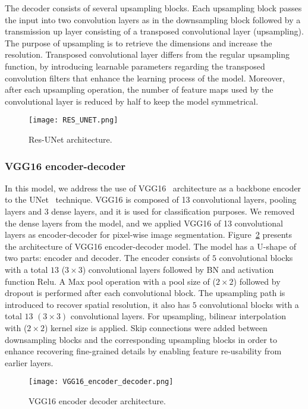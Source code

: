 The decoder consists of several upsampling blocks. 
Each upsampling block passes the input into two convolution layers as in the downsampling block followed by a transmission up layer consisting of a transposed convolutional layer (upsampling). 
The purpose of upsampling is to retrieve the dimensions and increase the resolution.
Transposed convolutional layer differs from the regular upsampling function, by introducing learnable parameters regarding the transposed convolution filters that enhance the learning process of the model. 
Moreover, after each upsampling operation, the number of feature maps used by the convolutional layer is reduced by half to keep the model symmetrical. 
\begin{figure} [h!]
	\begin{center}
		\texttt{[image: RES\_UNET.png]}
	\end{center}
	\caption{Res-UNet architecture.} 
	\label{fig:Unet}
\end{figure}
\subsubsection{VGG16 encoder-decoder}
In this model, we address the use of VGG16~\cite{Simonyan2015} architecture as a backbone encoder to the UNet~\cite{Ronneberger2015} technique.
VGG16 is composed of 13 convolutional layers, pooling layers and \(3\) dense layers, and it is used for classification purposes.
We removed the dense layers from the model, and we applied VGG16 of 13 convolutional layers as encoder-decoder for pixel-wise image segmentation.
Figure~\ref{vgg16} presents the architecture of VGG16 encoder-decoder model. 
The model has a U-shape of two parts: encoder and decoder.
The encoder consists of \(5\) convolutional blocks with a total \(13\)  (\(3\times3\)) convolutional layers followed by BN and activation function Relu.
A Max pool operation with a pool size of (\(2\times2\)) followed by dropout is performed after each convolutional block.  
The upsampling path is introduced to recover spatial resolution, it also has \(5\) convolutional blocks with a total \(13\) \((3\times 3)\) convolutional layers.
For upsampling, bilinear interpolation with (\(2\times2\)) kernel size is applied.
Skip connections were added between downsampling blocks and the corresponding upsampling blocks in order to enhance recovering fine-grained details by enabling feature re-usability from earlier layers.
\begin{figure} [h!]
	\begin{center}
		\texttt{[image: VGG16\_encoder\_decoder.png]}
	\end{center}
	\caption{VGG16 encoder decoder architecture.} 
	\label{vgg16}
\end{figure}
